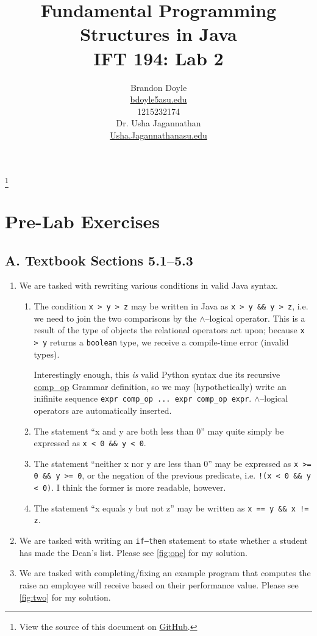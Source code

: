 \documentclass[leqno, 11pt]{article}
\title{\vspace{6ex}Fundamental Programming Structures in Java\\
  \Large IFT 194: Lab 2}
\author{Brandon Doyle\\
\href{mailto:bdoyle@asu.edu}{bdoyle5\at{}asu.edu}\\
1215232174\\[1em]
Dr. Usha Jagannathan\\
\href{mailto:Usha.Jagannathan@asu.edu}{Usha.Jagannathan\at{}asu.edu}}
\newcommand\blfootnote[1]{%
  \begingroup
    \renewcommand\thefootnote{}\footnote{#1}
    \addtocounter{footnote}{-1}
  \endgroup
}
\begin{document}
\begin{titlepage}
\clearpage\maketitle
\thispagestyle{empty}
\end{titlepage}
\blfootnote{View the source of this document on \href{https://github.com/bjd2385/IFT_194_labs/blob/master/\jobname.tex}{GitHub}.}
\section*{Pre-Lab Exercises}
\subsection*{A. Textbook Sections 5.1--5.3}
\begin{enumerate}
  \item We are tasked with rewriting various conditions in valid Java syntax. 
        \begin{enumerate}
          \item The condition \texttt{x > y > z} may be written in Java as \texttt{x > y \&\& y > z}, i.e. we need to join the two comparisons by the $\wedge$--logical operator. This is a result of the type of objects the relational operators act upon; because \texttt{x > y} returns a \texttt{boolean} type, we receive a compile-time error (invalid types).
    
                Interestingly enough, this \textit{is} valid Python syntax due its recursive \href{https://github.com/python/cpython/blob/master/Grammar/Grammar#L93}{comp\_op} Grammar definition, so we may (hypothetically) write an inifinite sequence \texttt{expr comp\_op ... expr comp\_op expr}. $\wedge$--logical operators are automatically inserted.
              \item The statement ``x and y are both less than 0'' may quite simply be expressed as \texttt{x < 0 \&\& y < 0}.
              \item The statement ``neither x nor y are less than 0'' may be expressed as \texttt{x >= 0 \&\& y >= 0}, or the negation of the previous predicate, i.e. \texttt{!(x < 0 \&\& y < 0)}. I think the former is more readable, however.
              \item The statement ``x equals y but not z'' may be written as \texttt{x == y \&\& x != z}.
        \end{enumerate}
  \item We are tasked with writing an \texttt{if--then} statement to state whether a student has made the Dean's list. Please see \autoref{fig:one} for my solution.
  \item We are tasked with completing/fixing an example program that computes the raise an employee will receive based on their performance value. Please see \autoref{fig:two} for my solution.
\end{enumerate}
\end{document}
